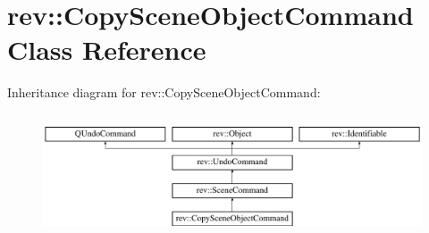 \hypertarget{classrev_1_1_copy_scene_object_command}{}\section{rev\+::Copy\+Scene\+Object\+Command Class Reference}
\label{classrev_1_1_copy_scene_object_command}
Inheritance diagram for rev\+::Copy\+Scene\+Object\+Command\+:\begin{figure}[H]
\begin{center}
\leavevmode
\includegraphics[height=3.678161cm]{classrev_1_1_copy_scene_object_command}
\end{center}
\end{figure}
